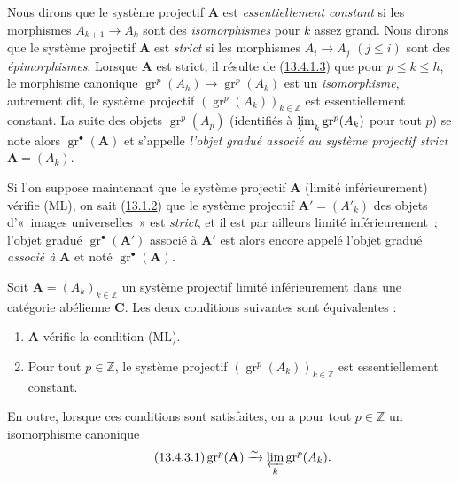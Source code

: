 \begin{env}[13.4.2]
\label{0.13.4.2-fr}
Nous dirons que le système projectif $\mathbf A$ est
\emph{essentiellement constant} si les morphismes
$A_{k+1}\to A_k$ sont des \emph{isomorphismes} pour $k$ assez grand. Nous
dirons que le système projectif $\mathbf A$ est \emph{strict} si les
morphismes $A_i\to A_j$ $(j\leq i)$ sont des \emph{épimorphismes}.
Lorsque $\mathbf A$ est strict, il résulte de
(\hyperref[0.13.4.1.3-fr]{13.4.1.3}) que pour $p\leq k\leq h$, le morphisme
canonique $\operatorname{gr}^p(A_h)\to\operatorname{gr}^p(A_k)$ est un
\emph{isomorphisme}, autrement dit, le système projectif
$(\operatorname{gr}^p(A_k))_{k\in\mathbb Z}$ est essentiellement constant.
La suite des objets $\operatorname{gr}^p(A_p)$ (identifiés à
$\varprojlim_k\operatorname{gr}^p(A_k)$ pour tout $p$) se note alors
$\operatorname{gr}^\bullet(\mathbf A)$ et s'appelle \emph{l'objet gradué
associé au système projectif strict} $\mathbf A=(A_k)$.

Si l'on suppose maintenant que le système projectif $\mathbf A$ (limité
inférieurement) vérifie (ML), on sait
(\hyperref[0.13.1.2-fr]{13.1.2}) que le système projectif
$\mathbf A'=(A'_k)$ des objets d'«~images universelles~» est \emph{strict},
et il est par ailleurs limité inférieurement~; l'objet gradué
$\operatorname{gr}^\bullet(\mathbf A')$ associé à $\mathbf A'$ est alors
encore appelé l'objet gradué \emph{associé à} $\mathbf A$ et noté
$\operatorname{gr}^\bullet(\mathbf A)$.
\end{env}

\begin{proposition}[13.4.3]
\label{0.13.4.3-fr}
Soit $\mathbf A=(A_k)_{k\in\mathbb Z}$ un système projectif limité
inférieurement dans une catégorie abélienne $\boldsymbol{C}$. Les deux conditions
suivantes sont équivalentes :
\begin{enumerate}
\item[\emph{a)}] $\mathbf A$ vérifie la condition \textup{(ML)}.
\item[\emph{b)}] Pour tout $p\in\mathbb Z$, le système projectif
$(\operatorname{gr}^p(A_k))_{k\in\mathbb Z}$ est essentiellement constant.
\end{enumerate}

En outre, lorsque ces conditions sont satisfaites, on a pour tout
$p\in\mathbb Z$ un isomorphisme canonique
\begin{equation}
\label{0.13.4.3.1-fr}
\tag{13.4.3.1}
\operatorname{gr}^p(\mathbf A)\xrightarrow{\sim}
\varprojlim_k\operatorname{gr}^p(A_k).
\end{equation}
\end{proposition}

